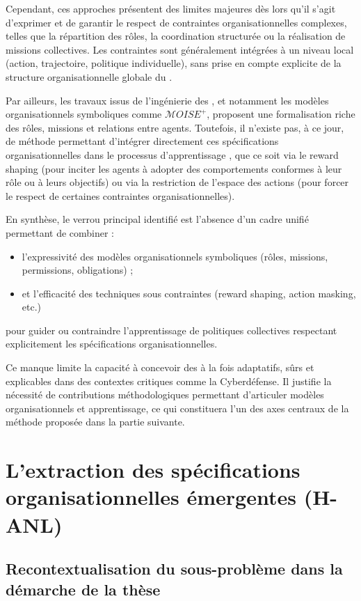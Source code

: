 Cependant, ces approches présentent des limites majeures dès lors qu'il s'agit d'exprimer et de garantir le respect de contraintes organisationnelles complexes, telles que la répartition des rôles, la coordination structurée ou la réalisation de missions collectives. Les contraintes sont généralement intégrées à un niveau local (action, trajectoire, politique individuelle), sans prise en compte explicite de la structure organisationnelle globale du .

Par ailleurs, les travaux issus de l'ingénierie des , et notamment les modèles organisationnels symboliques comme $\mathcal{M}OISE^+$, proposent une formalisation riche des rôles, missions et relations entre agents. Toutefois, il n'existe pas, à ce jour, de méthode permettant d'intégrer directement ces spécifications organisationnelles dans le processus d'apprentissage , que ce soit via le reward shaping (pour inciter les agents à adopter des comportements conformes à leur rôle ou à leurs objectifs) ou via la restriction de l'espace des actions (pour forcer le respect de certaines contraintes organisationnelles).

En synthèse, le verrou principal identifié est l'absence d'un cadre unifié permettant de combiner :
\begin{itemize}
  \item l'expressivité des modèles organisationnels symboliques (rôles, missions, permissions, obligations) ;
  \item et l'efficacité des techniques  sous contraintes (reward shaping, action masking, etc.)
\end{itemize}
pour guider ou contraindre l'apprentissage de politiques collectives respectant explicitement les spécifications organisationnelles.

Ce manque limite la capacité à concevoir des  à la fois adaptatifs, sûrs et explicables dans des contextes critiques comme la Cyberdéfense. Il justifie la nécessité de contributions méthodologiques permettant d'articuler modèles organisationnels et apprentissage, ce qui constituera l'un des axes centraux de la méthode proposée dans la partie suivante.


\section{L'extraction des spécifications organisationnelles émergentes (H-ANL)}

\subsection*{Recontextualisation du sous-problème dans la démarche de la thèse}

